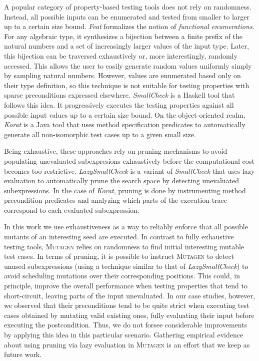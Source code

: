 \documentclass[sigconf, anonymous, review]{acmart}
\newcommand{\mutagen}{\textsc{Mutagen}\xspace}
\begin{document}
A popular category of property-based testing tools does not rely on randomness.
%
Instead, all possible inputs can be enumerated and tested from smaller to larger
up to a certain size bound.
%
%
%
\emph{Feat} \cite{DuregardJW12} formalizes the notion of \emph{functional
  enumerations}.
%
For any algebraic type, it synthesizes a bijection between a finite prefix of
the natural numbers and a set of increasingly larger values of the input type.
%
Later, this bijection can be traversed exhaustively or, more interestingly,
randomly accessed.
%
This allows the user to easily generate random values uniformly simply by
sampling natural numbers.
%
However, values are enumerated based only on their type definition, so this
technique is not suitable for testing properties with sparse preconditions
expressed elsewhere.
%
\emph{SmallCheck} \cite{runciman2008smallcheck} is a Haskell tool that follows
this idea.
%
It progressively executes the testing properties against all possible input
values up to a certain size bound.
%
On the object-oriented realm, \emph{Korat} \cite{boyapati2002korat} is a Java
tool that uses method specification predicates to automatically generate all
non-isomorphic test cases up to a given small size.


Being exhaustive, these approaches rely on pruning mechanisms to avoid
populating unevaluated subexpresions exhaustively before the computational cost
becomes too restrictive.
%
\emph{LazySmallCheck} is a variant of \emph{SmallCheck} that uses lazy
evaluation to automatically prune the search space by detecting unevaluated
subexpressions.
%
In the case of \emph{Korat}, pruning is done by instrumenting method
precondition predicates and analyzing which parts of the execution trace
correspond to each evaluated subexpression.


In this work we use exhaustiveness as a way to reliably enforce that all
possible mutants of an interesting seed are executed.
%
In contrast to fully exhaustive testing tools, \mutagen relies on randomness to
find initial interesting mutable test cases.
%
In terms of pruning, it is possible to instruct \mutagen to detect unused
subexpressions (using a technique similar to that of \emph{LazySmallCheck}) to
avoid scheduling mutations over their corresponding positions.
%
This could, in principle, improve the overall performance when testing
properties that tend to short-circuit, leaving parts of the input unevaluated.
%
In our case studies, however, we observed that their preconditions tend to be
quite strict when executing test cases obtained by mutating valid existing ones,
fully evaluating their input before executing the postcondition.
%
Thus, we do not forsee considerable improvements by applying this idea in this
particular scenario.
%
Gathering empirical evidence about using pruning via lazy evaluation in \mutagen
is an effort that we keep as future work.
\end{document}
